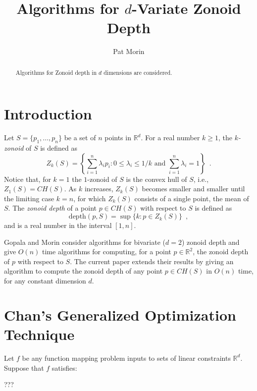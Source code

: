 \documentclass[lotsofwhite]{patmorin}
\title{Algorithms for $d$-Variate Zonoid Depth}
\author{Pat Morin}
\date{}
\newcommand{\CH}{\mathit{CH}}
\newcommand{\Z}{\mathit{Z}}
\newcommand{\depth}{\mathrm{depth}}
\begin{document}
\maketitle
\begin{abstract}
Algorithms for Zonoid depth in $d$ dimensions are considered.
\end{abstract}

\section{Introduction}

Let $S=\{p_1,\ldots,p_n\}$ be a set of $n$ points in $\mathbb{R}^d$.
For a real number $k\ge 1$, the \emph{$k$-zonoid} of $S$ is defined as 
\[
      \Z_k(S) = \left\{\sum_{i=1}^n \lambda_ip_i 
	: \mbox{$0\le \lambda_i\le 1/k$ 
	   and $\sum_{i=1}^n\lambda_i = 1$}  \right\} \enspace .
\] 
Notice that, for $k=1$ the $1$-zonoid of $S$ is the convex hull of
$S$,  i.e., $\Z_1(S)=\CH(S)$.
As $k$ increases, $\Z_k(S)$ becomes smaller and smaller until
the limiting case $k=n$, for which $\Z_k(S)$ consists of a single point,
the mean of $S$.  The \emph{zonoid depth} of a point
$p\in\CH(S)$ with respect to $S$ is defined as
\[
     \depth(p,S) = \sup\{k : p\in Z_k(S) \} \enspace ,
\]
and is a real number in the interval $[1,n]$.

Gopala and Morin \cite{gm06} consider algorithms for bivariate ($d=2$)
zonoid depth and give $O(n)$ time algorithms for computing, for a
point $p\in \mathbb{R}^2$, the zonoid depth of $p$ with respect to
$S$.  The current paper extends their results by giving an algorithm
to compute the zonoid depth of any point $p\in\CH(S)$ in $O(n)$ time,
for any constant dimension $d$.

\section{Chan's Generalized Optimization Technique}

\begin{thm}[Chan]
Let $f$ be any function mapping problem inputs to sets of linear
constraints
$\mathbb{R}^d$.
Suppose that $f$ satisfies:
\end{thm}

???
\end{document}
